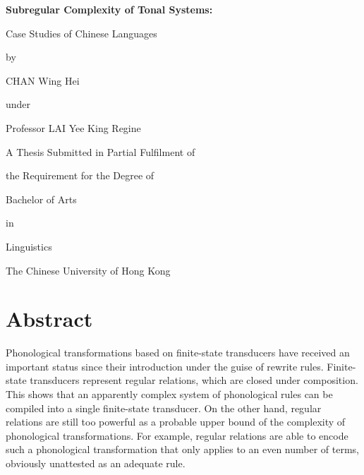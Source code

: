 \documentclass[12pt, a4paper]{report}
\newcommand{\cuhk}{The Chinese University of Hong Kong}
\begin{document}
\begin{titlepage}
  \vspace*{\fill}
  \begin{center}
    \begin{Large}
      \bfseries
      Subregular Complexity of Tonal Systems:

      Case Studies of Chinese Languages
    \end{Large}

    by

    CHAN Wing Hei

    under

    Professor LAI Yee King Regine

    \bigskip

    A Thesis Submitted in Partial Fulfilment of

    the Requirement for the Degree of

    Bachelor of Arts

    in

    Linguistics

    \bigskip

    \cuhk

    \monthyyyy{}
  \end{center}
  \doclicenseThis
  \vspace*{\fill}
\end{titlepage}

\cleardoublepage
{}

\chapter*{Abstract}
Phonological transformations based on finite-state transducers have
received an important status since their introduction under the guise
of rewrite rules.  Finite-state transducers represent regular
relations, which are closed under composition.  This shows that an
apparently complex system of phonological rules can be compiled into a
single finite-state transducer.  On the other hand, regular relations
are still too powerful as a probable upper bound of the complexity of
phonological transformations.  For example, regular relations are able
to encode such a phonological transformation that only applies to an
even number of terms, obviously unattested as an adequate rule.
\end{document}
